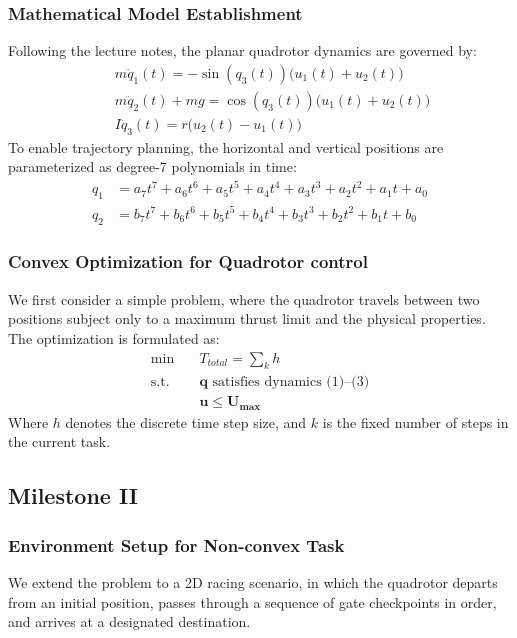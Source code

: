 \documentclass[conference]{IEEEtran}
\begin{document}
\subsubsection*{Mathematical Model Establishment}
Following the lecture notes, the planar quadrotor dynamics are governed by:
\begin{align}
    \quad &m\ddot q_1(t) = -\sin(q_3(t))\big(u_1(t)+u_2(t)\big) \label{eq:q1}\\
                     &m\ddot q_2(t) + mg = \cos(q_3(t))\big(u_1(t)+u_2(t)\big) \label{eq:q2} \\
                     &I\ddot q_3(t) = r\big(u_2(t)-u_1(t)\big) \label{eq:q3}
\end{align}
To enable trajectory planning, the horizontal and vertical positions are parameterized as degree-7 polynomials in time:
\begin{align*}
    q_1 &= a_7t^7 + a_6t^6+ a_5t^5 + a_4t^4+a_3t^3+a_2t^2+a_1t + a_0 \\
    q_2 &= b_7t^7 + b_6t^6+ b_5t^5 + b_4t^4+b_3t^3+b_2t^2+b_1t + b_0
\end{align*}

\subsubsection*{Convex Optimization for Quadrotor control}
We first consider a simple problem, where the quadrotor travels between two positions subject only to a maximum thrust limit and the physical properties. The optimization is formulated as:
\begin{align}
    \min \quad& T_{total}= \sum_{k} h\\
    \text{s.t.}\quad& \mathbf{q} \text{ satisfies dynamics (1)--(3)} \label{eq:model} \\
    & \mathbf{u} \le \mathbf{U_{max}} \label{eq:max_u}
\end{align}
Where $h$ denotes the discrete time step size, and $k$ is the fixed number of steps in the current task. 

\subsection*{Milestone II}
\subsubsection*{Environment Setup for Non-convex Task}
We extend the problem to a 2D racing scenario, in which the quadrotor departs from an initial position, passes through a sequence of gate checkpoints in order, and arrives at a designated destination.
\end{document}
